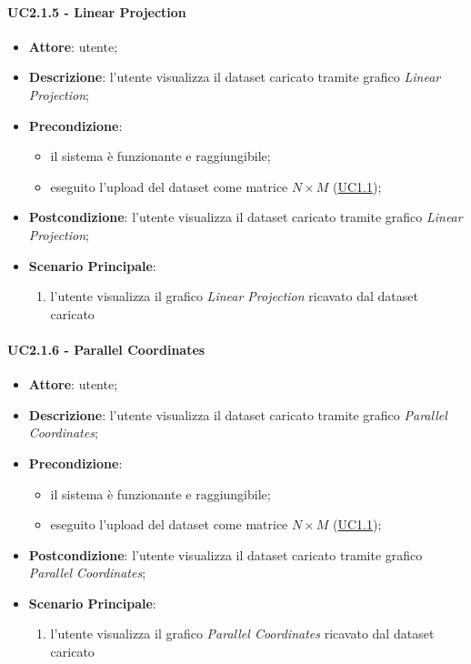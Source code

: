     \paragraph{UC2.1.5 - Linear Projection}
    \label{uc2.1.5}
    \begin{itemize}
    \item \textbf{Attore}: utente;
    \item \textbf{Descrizione}: l'utente visualizza il dataset caricato tramite grafico \emph{Linear Projection};
    \item \textbf{Precondizione}:
    \begin{itemize}
        \item il sistema è funzionante e raggiungibile;
        \item eseguito l'upload del dataset come matrice $N\times M$ (\hyperref[uc1.1]{UC1.1});
    \end{itemize}
    \item \textbf{Postcondizione}: l'utente visualizza il dataset caricato tramite grafico \emph{Linear Projection};
    \item \textbf{Scenario Principale}: 
        \begin{enumerate}
            \item l'utente visualizza il grafico \emph{Linear Projection} ricavato dal dataset caricato
        \end{enumerate}
    \end{itemize}
    
    \paragraph{UC2.1.6 - Parallel Coordinates}
    \label{uc2.1.6}
    
    \begin{itemize}
    \item \textbf{Attore}: utente;
    \item \textbf{Descrizione}: l'utente visualizza il dataset caricato tramite grafico \emph{Parallel Coordinates};
    \item \textbf{Precondizione}:
    \begin{itemize}
        \item il sistema è funzionante e raggiungibile;
        \item eseguito l'upload del dataset come matrice $N\times M$ (\hyperref[uc1.1]{UC1.1});
    \end{itemize}
    \item \textbf{Postcondizione}: l'utente visualizza il dataset caricato tramite grafico \emph{Parallel Coordinates};
    \item \textbf{Scenario Principale}:
        \begin{enumerate}
            \item l'utente visualizza il grafico \emph{Parallel Coordinates} ricavato dal dataset caricato
        \end{enumerate}
    \end{itemize}
    
  
